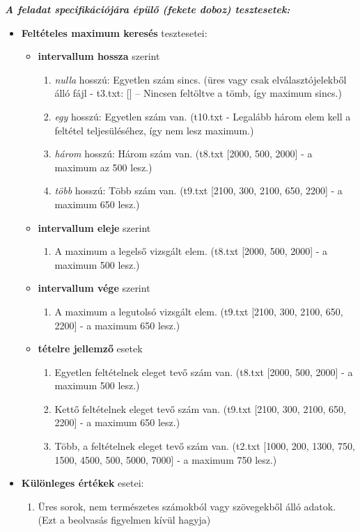 \documentclass[12pt]{report}
\begin{document}
\textit{\textbf{A feladat specifikációjára épülő (fekete doboz) tesztesetek:}}
\begin{itemize}[noitemsep]
\item \textbf{Feltételes maximum keresés} tesztesetei:
\begin{itemize}[noitemsep]
\item \textbf{intervallum hossza} szerint
\begin{enumerate}[noitemsep]
\item \textit{nulla} hosszú: Egyetlen szám sincs. (üres vagy csak elválasztójelekből álló fájl - t3.txt: [] – Nincsen feltöltve a tömb, így maximum sincs.) 
\item \textit{egy} hosszú: Egyetlen szám van. (t10.txt - Legalább három elem kell a feltétel teljesüléséhez, így nem lesz maximum.)
\item \textit{három} hosszú: Három szám van. (t8.txt [2000, 500, 2000] - a maximum az 500 lesz.)
\item \textit{több} hosszú: Több szám van. (t9.txt [2100, 300, 2100, 650, 2200] - a maximum 650 lesz.)
\end{enumerate}
\end{itemize}
\begin{itemize}[noitemsep]
\item \textbf{intervallum eleje} szerint
\begin{enumerate}[noitemsep]
\item A maximum a legelső vizsgált elem. (t8.txt [2000, 500, 2000] - a maximum 500 lesz.)
\end{enumerate}
\end{itemize}
\begin{itemize}[noitemsep]
\item \textbf{intervallum vége} szerint
\begin{enumerate}[noitemsep]
\item A maximum a legutolsó vizsgált elem. (t9.txt [2100, 300, 2100, 650, 2200] - a maximum 650 lesz.)
\end{enumerate}
\end{itemize}
\begin{itemize}[noitemsep]
\item \textbf{tételre jellemző} esetek
\begin{enumerate}[noitemsep]
\item Egyetlen feltételnek eleget tevő szám van. (t8.txt [2000, 500, 2000] - a maximum 500 lesz.)
\item Kettő feltételnek eleget tevő szám van. (t9.txt [2100, 300, 2100, 650, 2200] - a maximum 650 lesz.)
\item Több, a feltételnek eleget tevő szám van. (t2.txt [1000, 200, 1300, 750, 1500, 4500, 500, 5000, 7000] - a maximum 750 lesz.)
\end{enumerate}
\end{itemize}
\item \textbf{Különleges értékek} esetei:
\begin{enumerate}[noitemsep]
\item Üres sorok, nem természetes számokból vagy szövegekből álló adatok. (Ezt a beolvasás figyelmen kívül hagyja)
\end{enumerate}
\end{itemize}
\end{document}
